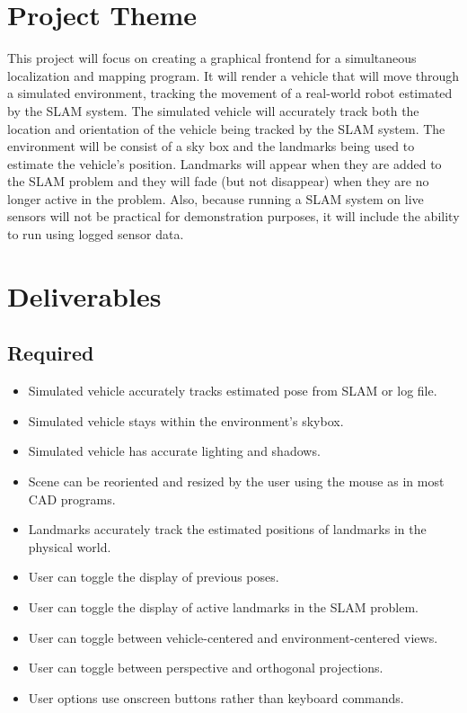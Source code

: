 \documentclass[11pt]{article}
\begin{document}
\thispagestyle{empty}

\newlength{\boxlength}\setlength{\boxlength}{\textwidth}
\addtolength{\boxlength}{-4mm}

\begin{center}
\end{center}

\section*{Project Theme}
This project will focus on creating a graphical frontend for a simultaneous localization and mapping program. It will render a vehicle that will move through a simulated environment, tracking the movement of a real-world robot estimated by the SLAM system. The simulated vehicle will accurately track both the location and orientation of the vehicle being tracked by the SLAM system. The environment will be consist of a sky box and the landmarks being used to estimate the vehicle's position. Landmarks will appear when they are added to the SLAM problem and they will fade (but not disappear) when they are no longer active in the problem.  Also, because running a SLAM system on live sensors will not be practical for demonstration purposes, it will include the ability to run using logged sensor data.

\section*{Deliverables}

\subsection*{Required}
\begin{itemize}
\item Simulated vehicle accurately tracks estimated pose from SLAM or log file.
\item Simulated vehicle stays within the environment's skybox.
\item Simulated vehicle has accurate lighting and shadows.
\item Scene can be reoriented and resized by the user using the mouse as in most CAD programs.
\item Landmarks accurately track the estimated positions of landmarks in the physical world.
\item User can toggle the display of previous poses.
\item User can toggle the display of active landmarks in the SLAM problem.
\item User can toggle between vehicle-centered and environment-centered views.
\item User can toggle between perspective and orthogonal projections. 
\item User options use onscreen buttons rather than keyboard commands.
\end{itemize}
\end{document}
